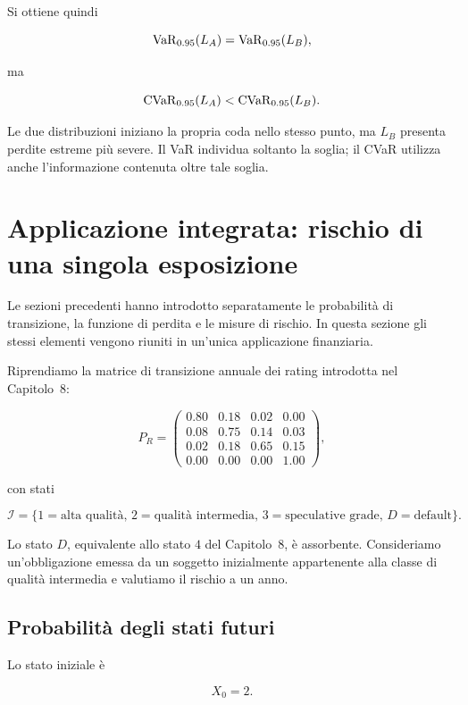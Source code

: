 Si ottiene quindi

\[
\operatorname{VaR}_{0.95}(L_A)
=
\operatorname{VaR}_{0.95}(L_B),
\]

ma

\[
\operatorname{CVaR}_{0.95}(L_A)
<
\operatorname{CVaR}_{0.95}(L_B).
\]

Le due distribuzioni iniziano la propria coda nello stesso punto, ma
$L_B$ presenta perdite estreme pi\`{u} severe. Il VaR individua
soltanto la soglia; il CVaR utilizza anche l'informazione contenuta
oltre tale soglia.

\section{Applicazione integrata: rischio di una singola esposizione}

\label{sec:cap9-applicazione-singola-esposizione}

Le sezioni precedenti hanno introdotto separatamente le probabilit\`{a}
di transizione, la funzione di perdita e le misure di rischio. In
questa sezione gli stessi elementi vengono riuniti in un'unica
applicazione finanziaria.

Riprendiamo la matrice di transizione annuale dei rating introdotta nel
Capitolo~8:

\[
P_R
=
\begin{pmatrix}
0.80 & 0.18 & 0.02 & 0.00\\
0.08 & 0.75 & 0.14 & 0.03\\
0.02 & 0.18 & 0.65 & 0.15\\
0.00 & 0.00 & 0.00 & 1.00
\end{pmatrix},
\]

con stati

\[
\mathcal{I}
=
\{
1=\text{alta qualit\`{a}},
\,
2=\text{qualit\`{a} intermedia},
\,
3=\text{speculative grade},
\,
D=\text{default}
\}.
\]

Lo stato $D$, equivalente allo stato $4$ del Capitolo~8, \`{e}
assorbente. Consideriamo un'obbligazione emessa da un soggetto
inizialmente appartenente alla classe di qualit\`{a} intermedia e
valutiamo il rischio a un anno.

\subsection{Probabilit\`{a} degli stati futuri}

\label{subsec:cap9-applicazione-probabilita-stati}

Lo stato iniziale \`{e}

\[
X_0=2.
\]

